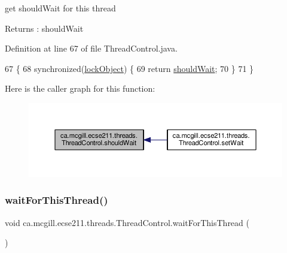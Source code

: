 get should\+Wait for this thread \begin{DoxyReturn}{Returns}
\+: should\+Wait 
\end{DoxyReturn}


Definition at line 67 of file Thread\+Control.\+java.


\begin{DoxyCode}
67                               \{
68     \textcolor{keyword}{synchronized}(\hyperlink{classca_1_1mcgill_1_1ecse211_1_1threads_1_1_thread_control_ab20c44ff2dafab8981c42fa8bf634dfc}{lockObject}) \{
69       \textcolor{keywordflow}{return} \hyperlink{classca_1_1mcgill_1_1ecse211_1_1threads_1_1_thread_control_a9c3896500e86e402b8019e1be6500621}{shouldWait};
70     \}
71   \}
\end{DoxyCode}
Here is the caller graph for this function\+:
\nopagebreak
\begin{figure}[H]
\begin{center}
\leavevmode
\includegraphics[width=350pt]{classca_1_1mcgill_1_1ecse211_1_1threads_1_1_thread_control_a9c3896500e86e402b8019e1be6500621_icgraph}
\end{center}
\end{figure}
\mbox{\label{classca_1_1mcgill_1_1ecse211_1_1threads_1_1_thread_control_a6a25ccb2d8916b8e6cc4b3bb0e9d2ed7}} 
\subsubsection{\texorpdfstring{wait\+For\+This\+Thread()}{waitForThisThread()}}
{\footnotesize\ttfamily void ca.\+mcgill.\+ecse211.\+threads.\+Thread\+Control.\+wait\+For\+This\+Thread (\begin{DoxyParamCaption}{ }\end{DoxyParamCaption})}

